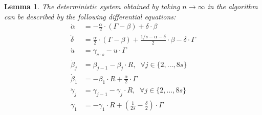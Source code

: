\documentclass[a4paper,12pt]{article}
\newtheorem{lemma}{Lemma}
\begin{document}
\begin{lemma} \label{lem:def_deterministic}
The deterministic system obtained by taking $n \to \infty$ in the algorithm can be described by the following differential equations:
\begin{align}
\dot{\alpha} & = - \frac{\alpha}{2} \cdot \left(\Gamma - \beta \right) + \delta \cdot \beta \label{alpha_dot} \\
\dot{\delta} & = \frac{\alpha}{2} \cdot \left(\Gamma - \beta \right) + \frac{1/s - \alpha - \delta}{2} \cdot \beta - \delta \cdot \Gamma \\
\dot{u} & = \gamma_{c \cdot s} - u \cdot \Gamma \label{u_dot} \\
\label{eq:def_beta_j_dot}
\dot{\beta}_j & = \beta_{j-1} - \beta_j \cdot R, \; \; \forall j \in\{2, \ldots, 8s\}\\
\label{eq:def_beta_1_dot}
\dot{\beta}_1 & = -\beta_1 \cdot R + \frac{\alpha}{2} \cdot \Gamma \\
\dot{\gamma}_j & = \gamma_{j-1} - \gamma_j \cdot R, \; \; \forall j \in \{2, \ldots, 8s\} \label{gamma_j_dot} \\
\dot{\gamma}_1 & = - \gamma_1 \cdot R + \left(\frac{1}{2s} - \frac{\delta}{2}\right) \cdot \Gamma \label{gamma_1_dot}
\end{align}
\end{lemma}
\end{document}
